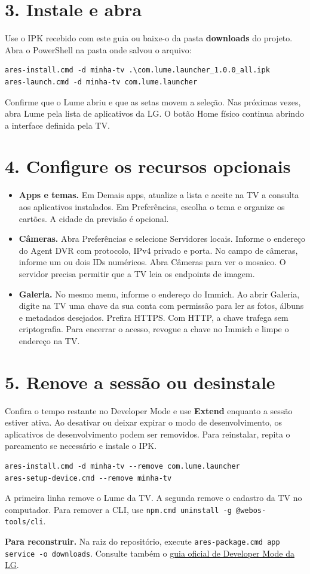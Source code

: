 \documentclass[11pt,a4paper]{article}
\begin{document}
\section*{3. Instale e abra}
Use o IPK recebido com este guia ou baixe-o da pasta \textbf{downloads} do projeto. Abra o PowerShell na pasta onde salvou o arquivo:
\begin{verbatim}
ares-install.cmd -d minha-tv .\com.lume.launcher_1.0.0_all.ipk
ares-launch.cmd -d minha-tv com.lume.launcher
\end{verbatim}
Confirme que o Lume abriu e que as setas movem a seleção. Nas próximas vezes, abra Lume pela lista de aplicativos da LG. O botão Home físico continua abrindo a interface definida pela TV.
\newpage\section*{4. Configure os recursos opcionais}
\begin{itemize}
\item \textbf{Apps e temas.} Em Demais apps, atualize a lista e aceite na TV a consulta aos aplicativos instalados. Em Preferências, escolha o tema e organize os cartões. A cidade da previsão é opcional.
\item \textbf{Câmeras.} Abra Preferências e selecione Servidores locais. Informe o endereço do Agent DVR com protocolo, IPv4 privado e porta. No campo de câmeras, informe um ou dois IDs numéricos. Abra Câmeras para ver o mosaico. O servidor precisa permitir que a TV leia os endpoints de imagem.
\item \textbf{Galeria.} No mesmo menu, informe o endereço do Immich. Ao abrir Galeria, digite na TV uma chave da sua conta com permissão para ler as fotos, álbuns e metadados desejados. Prefira HTTPS. Com HTTP, a chave trafega sem criptografia. Para encerrar o acesso, revogue a chave no Immich e limpe o endereço na TV.
\end{itemize}
\section*{5. Renove a sessão ou desinstale}
Confira o tempo restante no Developer Mode e use \textbf{Extend} enquanto a sessão estiver ativa. Ao desativar ou deixar expirar o modo de desenvolvimento, os aplicativos de desenvolvimento podem ser removidos. Para reinstalar, repita o pareamento se necessário e instale o IPK.
\begin{verbatim}
ares-install.cmd -d minha-tv --remove com.lume.launcher
ares-setup-device.cmd --remove minha-tv
\end{verbatim}
A primeira linha remove o Lume da TV. A segunda remove o cadastro da TV no computador. Para remover a CLI, use \verb|npm.cmd uninstall -g @webos-tools/cli|.

\textbf{Para reconstruir.} Na raiz do repositório, execute \verb|ares-package.cmd app service -o downloads|. Consulte também o \href{https://webostv.developer.lge.com/develop/getting-started/developer-mode-app}{guia oficial de Developer Mode da LG}.
\end{document}
